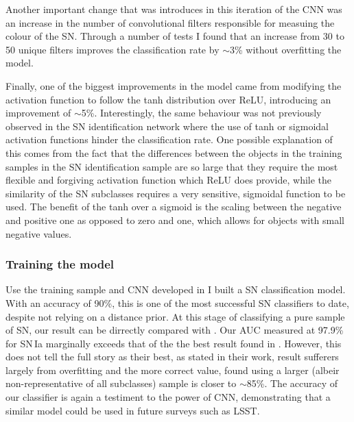 \begin{figure}
  \caption{}
  \label{fig:SNClassificationNetwork}
\end{figure}

Another important change that was introduces in this iteration of the CNN was an increase in the number of convolutional filters responsible for measuing the colour of the SN. Through a number of tests I found that an increase from 30 to 50 unique filters improves the classification rate by $\sim$3\% without overfitting the model.

Finally, one of the biggest improvements in the model came from modifying the activation function to follow the tanh distribution over ReLU, introducing an improvement of $\sim$5\%. Interestingly, the same behaviour was not previously observed in the SN identification network where the use of tanh or sigmoidal activation functions hinder the classification rate. One possible explanation of this comes from the fact that the differences between the objects in the training samples in the SN identification sample are so large that they require the most flexible and forgiving activation function which ReLU does provide, while the similarity of the SN subclasses requires a very sensitive, sigmoidal function to be used. The benefit of the tanh over a sigmoid is the scaling between the negative and positive one as opposed to zero and one, which allows for objects with small negative values.

\subsubsection{Training the model} \label{sec:SNClassification}
 Use the training sample and CNN developed in  I built a SN classification model. With an accuracy of 90\%, this is one of the most successful SN classifiers to date, despite not relying on a distance prior. At this stage of classifying a pure sample of SN, our result can be dirrectly compared with \citet{Lochner2016}. Our AUC measured at 97.9\% for SN\,Ia marginally exceeds that of the the best result found in \citet{Lochner2016}. However, this does not tell the full story as their best, as stated in their work, result sufferers largely from overfitting and the more correct value, found using a larger (albeir non-representative of all subclasses) sample is closer to $\sim$85\%. The accuracy of our classifier is again a testiment to the power of CNN, demonstrating that a similar model could be used in future surveys such as LSST.

